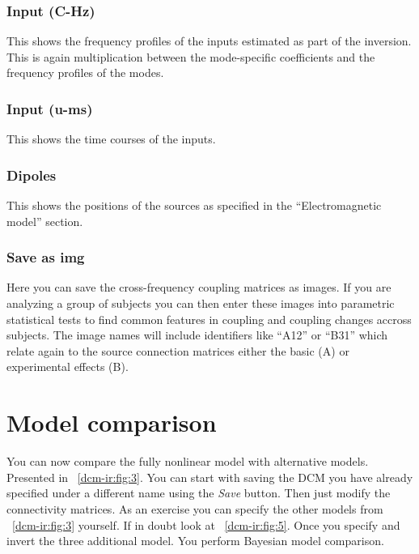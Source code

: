 \subsubsection{Input (C-Hz)}
This shows the frequency profiles of the inputs estimated as part of the inversion. This is again multiplication between the mode-specific coefficients and the frequency profiles of the modes. 

\subsubsection{Input (u-ms)}
This shows the time courses of the inputs.

\subsubsection{Dipoles}
This shows the positions of the sources as specified in the ``Electromagnetic model'' section.

\subsubsection{Save as img}
Here you can save the cross-frequency coupling matrices as images. If you are analyzing a group of subjects you can then enter these images into parametric statistical tests to find common features in coupling and coupling changes accross subjects. The image names will include identifiers like ``A12'' or ``B31'' which relate again to the source connection matrices either the basic (A) or experimental effects (B).

\section{Model comparison}

You can now compare the fully nonlinear model with alternative models. Presented in  ~\ref{dcm-ir:fig:3}. You can start with saving the DCM you have already specified under a different name using the \textit{Save} button. Then just modify the connectivity matrices. As an exercise you can specify the other models from ~\ref{dcm-ir:fig:3} yourself. If in doubt look at ~\ref{dcm-ir:fig:5}. Once you specify and invert the three additional model. You perform Bayesian model comparison. 

